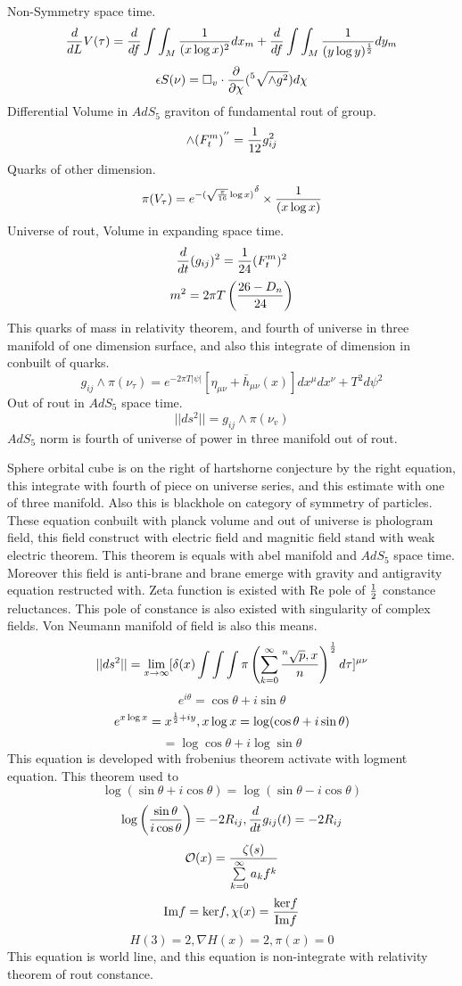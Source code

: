 \documentclass{jsarticle}
\begin{document}
 Non-Symmetry space time.
 $$ {d \over dL}V(\tau) = {d \over df}\int \int_M {1 \over (x \log x)^2}dx_m + {d \over df}\int \int_M
 {1 \over (y \log y)^{1 \over 2}}dy_m $$
 $$ \epsilon S(\nu) = \square_v \cdot {\partial \over \partial \chi}({}^5 \sqrt{\wedge g^2})d\chi $$
 Differential Volume in $AdS_5$ graviton of fundamental rout of group.
 $$ \wedge (F^m_t)^{''} = {1 \over 12}g_{ij}^2$$
 Quarks of other dimension.
 $$ \pi(V_{\tau}) = {e^{-(\sqrt{\pi \over 16}\log x)}}^{\delta} \times {1 \over (x \log x)} $$
 Universe of rout, Volume in expanding space time.
 $$ {d \over dt}(g_{ij})^2 = {1 \over 24}(F^m_t)^2 $$
 $$ m^2 = 2 \pi T \left({26 - D_n \over 24}\right) $$
 This quarks of mass in relativity theorem, and fourth of universe in three manifold of one dimension surface,
 and also this integrate of dimension in conbuilt of quarks.
 $$ g_{ij} \wedge \pi(\nu_{\tau}) = e^{-2 \pi T |\psi|}[\eta_{\mu\nu} + \bar{h}_{\mu\nu}(x)]dx^{\mu}dx^{\nu} 
 + T^2 d \psi^2 $$
 Out of rout in $AdS_5$ space time.
 $$ ||ds^2|| = g_{ij}\wedge \pi(\nu_v) $$
 $AdS_5$ norm is fourth of universe of power in three manifold out of rout.


  Sphere orbital cube is on the right of hartshorne conjecture by the right equation,
this integrate with fourth of piece on universe series, and this estimate with one of three manifold.
Also this is blackhole on category of symmetry of particles.
These equation conbuilt with planck volume and out of universe is phologram field, this field construct with
electric field and magnitic field stand with weak electric theorem.
This theorem is equals with abel manifold and $AdS_5$ space time.
Moreover this field is anti-brane and brane emerge with gravity and antigravity equation restructed with.
Zeta function is existed with Re pole of ${1 \over 2}$ constance reluctances.
This pole of constance is also existed with singularity of complex fields.
Von Neumann manifold of field is also this means.
$$ ||ds^2|| = \lim_{x \to \infty} [\delta(x)\int \int \int \pi \left( \sum_{k=0}^{\infty}{{}^n\sqrt{p},x \over n}\right)
^{1 \over 2}d \tau]^{\mu\nu} $$
$$ e^{i \theta} = \cos \theta + i \sin \theta $$
$$ e^{x \log x} = x^{{1 \over 2} + iy}, x \log x = \log (\cos \theta + i \sin \theta) $$
$$ = \log \cos \theta + i \log \sin \theta $$
This equation is developed with frobenius theorem activate with logment equation.
This theorem used to
$$ \log(\sin \theta + i \cos \theta)= \log(\sin \theta - i \cos \theta) $$
$$ \log \left({\sin \theta \over i \cos \theta}\right) = -2 R_{ij}, {d \over dt}g_{ij}(t) =  - 2 R_{ij} $$
$$ \mathcal{O}(x) = {\zeta(s) \over \sum\limits_{k=0}^{\infty}a_k f^k} $$
$$ \mathrm{Im} f = \mathrm{ker} f, \chi(x) = {\mathrm{ker}f \over \mathrm{Im}f} $$ $$ H(3) = 2, \nabla H(x) = 2, 
 \pi(x) = 0 $$
 This equation is world line, and this equation is non-integrate with relativity theorem of rout constance.
\end{document}
